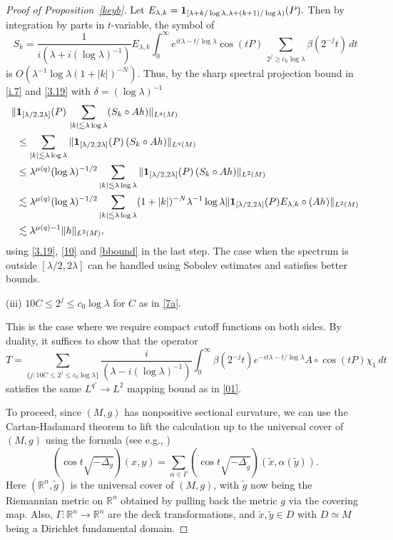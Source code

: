 \documentclass[10pt]{amsart}
\newcommand{\Rn}{{\mathbb R}^n}
\newcommand{\la}{\lambda}
\newcommand{\one}{{\bf 1}}
\newcommand{\1}{{\bf 1}}
\begin{document}
\begin{proof}[Proof of Proposition~\ref{keyb}]
Let
$E_{\la,k}=\one_{[\la+k/\log\la, \la +(k+1)/\log\la)}( P).$ 
Then by integration by parts in $t$-variable, the symbol of 
$$S_k=\frac1{i(\la+i(\log\la)^{-1})}E_{\la,k}\int_0^\infty e^{it\la-t/\log\la}\cos (tP)\,\sum_{2^j\ge c_0\log\la}\beta(2^{-j}t)\,dt
$$
is $O\left(\la^{-1}\log\la (1+|k|)^{-N}\right )$. Thus, by the sharp spectral projection bound in \eqref{i.7} and \eqref{3.19} with $\delta=(\log\la)^{-1}$
\begin{align*}
\|&\one_{[\la/2,2\la]}( P) \, 
 \sum_{|k|\lesssim \la\log\la}(
 S_k\circ A h)\|_{L^q( M)}
\\
&\le \sum_{|k|\lesssim \la\log\la}
\|\one_{[\la/2,2\la]}( P) \,(S_k\circ A h)\|_{L^q( M)}
\\
&\le  \la^{\mu(q)}(\log\la)^{-1/2}  \sum_{|k|\lesssim \la\log\la}
\| \one_{[\la/2,2\la]}( P) \, (S_k\circ A h)\|_{L^2( M)}
\\
&\lesssim \la^{\mu(q)}(\log\la)^{-1/2}\sum_{|k|\lesssim \la\log\la} (1+|k|)^{-N} \la^{-1}\log\la  \|\one_{[\la/2,2\la]}( P) E_{\la,k} \circ (A h)\|_{L^2( M)}
\\
&\lesssim \la^{\mu(q)-1}  \|h\|_{L^2( M)},
\end{align*}
 using \eqref{3.19}, \eqref{10} and \eqref{bbound} in the last step.
The case when the spectrum is outside {$[\la/2,2\la]$} can be handled using Sobolev estimates and satisfies better bounds.






\noindent(iii) $10C \le 2^j\le c_0\log\la$ for $C$ as in \eqref{7a}.


This is the case where we require compact cutoff functions on both sides. 
By duality, it suffices to show that
 the operator
\begin{equation}\label{20}
  T= \sum_{\{j: 10C\le 2^j\le c_0\log\la\}}\frac i{(\la-i(\log\la)^{-1})}\int_0^\infty \beta(2^{-j}t)e^{-it\la-t/\log\la}   A\circ \cos (tP)\chi_1\,dt
\end{equation}
satisfies the same $L^{q'}\to L^2$ mapping bound as in  \eqref{01}.


To proceed, since $(M,g)$ has nonpositive sectional curvature, we can use the 
Cartan-Hadamard theorem to lift the calculation up to the universal
cover of $(M,g)$ using the formula
(see e.g., \cite[(3.6.4)]{SoggeHangzhou})
\begin{equation}\label{k.3}
    (\cos t\sqrt{-\Delta_{g}})(x,y)
=\sum_{\alpha\in \Gamma}
(\cos t\sqrt{-\Delta_{\tilde g}})(\tilde x,\alpha(\tilde y)).
\end{equation}
Here $(\Rn,\tilde g)$ is the universal cover of 
$(M,g)$, with $\tilde g$ now being the Riemannian metric
on $\Rn$ obtained by pulling back the metric $g$
via the covering map.   Also, $\Gamma: \Rn\to \Rn$ are the 
deck transformations, and $\tilde x, \tilde y \in D$ with $D\simeq M$ being a Dirichlet fundamental domain. 



\end{proof}
\end{document}
